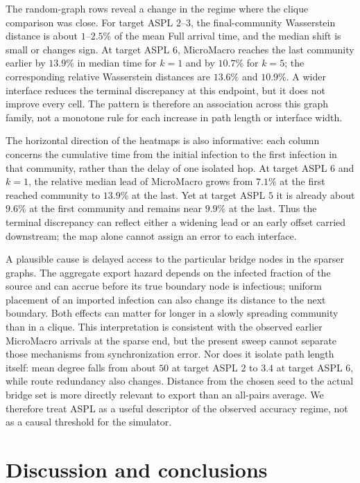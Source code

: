 \documentclass[a4paper,fleqn]{cas-sc}
\begin{document}
The random-graph rows reveal a change in the regime where the clique comparison was close. For target ASPL $2$--$3$, the final-community Wasserstein distance is about $1$--$2.5\%$ of the mean Full arrival time, and the median shift is small or changes sign. At target ASPL $6$, MicroMacro reaches the last community earlier by $13.9\%$ in median time for $k=1$ and by $10.7\%$ for $k=5$; the corresponding relative Wasserstein distances are $13.6\%$ and $10.9\%$. A wider interface reduces the terminal discrepancy at this endpoint, but it does not improve every cell. The pattern is therefore an association across this graph family, not a monotone rule for each increase in path length or interface width.

The horizontal direction of the heatmaps is also informative: each column concerns the cumulative time from the initial infection to the first infection in that community, rather than the delay of one isolated hop. At target ASPL $6$ and $k=1$, the relative median lead of MicroMacro grows from $7.1\%$ at the first reached community to $13.9\%$ at the last. Yet at target ASPL $5$ it is already about $9.6\%$ at the first community and remains near $9.9\%$ at the last. Thus the terminal discrepancy can reflect either a widening lead or an early offset carried downstream; the map alone cannot assign an error to each interface.

A plausible cause is delayed access to the particular bridge nodes in the sparser graphs. The aggregate export hazard depends on the infected fraction of the source and can accrue before its true boundary node is infectious; uniform placement of an imported infection can also change its distance to the next boundary. Both effects can matter for longer in a slowly spreading community than in a clique. This interpretation is consistent with the observed earlier MicroMacro arrivals at the sparse end, but the present sweep cannot separate those mechanisms from synchronization error. Nor does it isolate path length itself: mean degree falls from about $50$ at target ASPL $2$ to $3.4$ at target ASPL $6$, while route redundancy also changes. Distance from the chosen seed to the actual bridge set is more directly relevant to export than an all-pairs average. We therefore treat ASPL as a useful descriptor of the observed accuracy regime, not as a causal threshold for the simulator.

\section{Discussion and conclusions}
\end{document}
